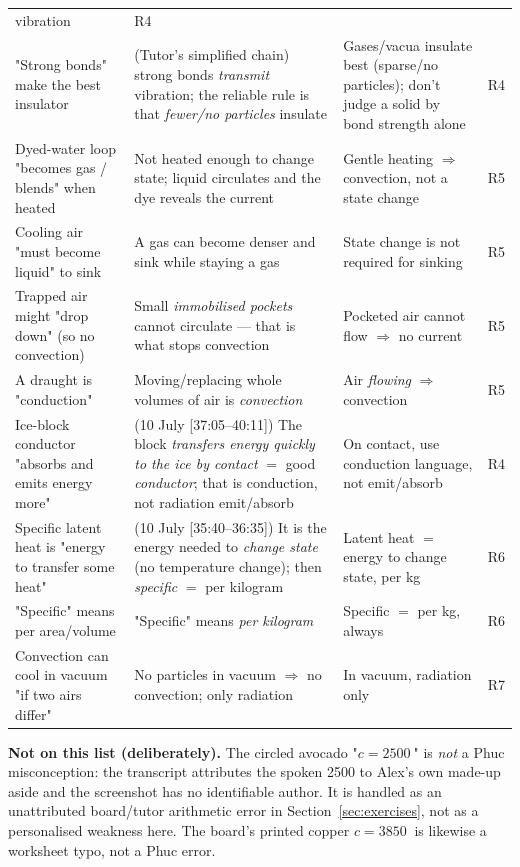 \documentclass[11pt,a4paper]{article}
\newcommand{\ts}[1]{\textup{[#1]}}       %
\begin{document}
\begin{longtable}{@{}p{3.5cm}p{4.4cm}p{4.2cm}p{2.6cm}@{}}
vibration & R4 \\
"Strong bonds" make the best insulator & (Tutor's simplified chain) strong bonds
\emph{transmit} vibration; the reliable rule is that \emph{fewer/no particles} insulate &
Gases/vacua insulate best (sparse/no particles); don't judge a solid by bond strength alone
& R4 \\
Dyed-water loop "becomes gas / blends" when heated & Not heated enough to change state;
liquid circulates and the dye reveals the current & Gentle heating $\Rightarrow$ convection,
not a state change & R5 \\
Cooling air "must become liquid" to sink & A gas can become denser and sink while staying a
gas & State change is not required for sinking & R5 \\
Trapped air might "drop down" (so no convection) & Small \emph{immobilised pockets} cannot
circulate --- that is what stops convection & Pocketed air cannot flow $\Rightarrow$ no
current & R5 \\
A draught is "conduction" & Moving/replacing whole volumes of air is \emph{convection} &
Air \emph{flowing} $\Rightarrow$ convection & R5 \\
Ice-block conductor "absorbs and emits energy more" & (10 July \ts{37:05--40:11}) The block
\emph{transfers energy quickly to the ice by contact} $=$ good \emph{conductor}; that is
conduction, not radiation emit/absorb & On contact, use conduction language, not
emit/absorb & R4 \\
Specific latent heat is "energy to transfer some heat" & (10 July \ts{35:40--36:35}) It is
the energy needed to \emph{change state} (no temperature change); then \emph{specific} $=$
per kilogram & Latent heat $=$ energy to change state, per kg & R6 \\
"Specific" means per area/volume & "Specific" means \emph{per kilogram} & Specific $=$ per
kg, always & R6 \\
Convection can cool in vacuum "if two airs differ" & No particles in vacuum $\Rightarrow$ no
convection; only radiation & In vacuum, radiation only & R7 \\
\bottomrule
\end{longtable}

\begin{plainbox}
\textbf{Not on this list (deliberately).} The circled avocado
"$c=\SI{2500}{}$" is \emph{not} a Phuc misconception: the transcript attributes the spoken
2500 to Alex's own made-up aside and the screenshot has no identifiable author. It is
handled as an unattributed board/tutor arithmetic error in
Section~\ref{sec:exercises}, not as a personalised weakness here. The board's printed
copper $c=\SI{3850}{}$ is likewise a worksheet typo, not a Phuc error.
\end{plainbox}
\end{document}
